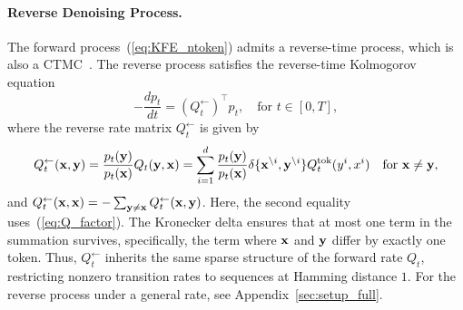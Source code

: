 \documentclass{article} %
\def\eqref#1{equation~\ref{#1}}
\newcommand{\bfx}{{\bf x}}
\newcommand{\bfy}{ {\bf y}}
\newcommand{\backQt}{Q_t^{\leftarrow}}
\renewcommand{\eqref}[1]{\textup{(\ref{#1})}}
\begin{document}
\paragraph{Reverse Denoising Process.} The forward process~\eqref{eq:KFE_ntoken} admits a reverse-time process, which is also a CTMC~\citep{kelly1979reversibility}. The reverse process satisfies the reverse-time Kolmogorov equation
\newcommand{\reverseeq}{-\frac{dp_{t}}{dt} = (\backQt)^\top p_{t}, \quad \text{for } t \in [0, T],}
\begin{equation}\label{eq:reverse}
    \reverseeq
\end{equation}
where the reverse rate matrix $\backQt$ is given by
\newcommand{\reversematrixntokeneq}{\backQt(\bfx, \bfy) = \frac{p_{t}(\bfy)}{p_{t}(\bfx)} Q_{t}(\bfy, \bfx) = \sum_{i=1}^d \frac{p_{t}(\bfy)}{p_{t}(\bfx)} \delta\{\bfx^{\backslash i}, \bfy^{\backslash i}\} Q^{\mathrm{tok}}_t(y^i, x^i) \quad \text{for } \bfx \neq \bfy,}
\begin{equation}\label{eq:reverse_matrix_ntoken}
    \reversematrixntokeneq
\end{equation}
and $\backQt(\bfx, \bfx) = -\sum_{\bfy \neq \bfx} \backQt(\bfx, \bfy)$. Here, the second equality uses~\eqref{eq:Q_factor}. The Kronecker delta ensures that at most one term in the summation survives, specifically, the term where $\bfx$ and $\bfy$ differ by exactly one token. Thus, $\backQt$ inherits the same sparse structure of the forward rate $Q_t$, restricting nonzero transition rates to sequences at Hamming distance $1$. For the reverse process under a general rate, see Appendix~\ref{sec:setup_full}.
 
\end{document}
